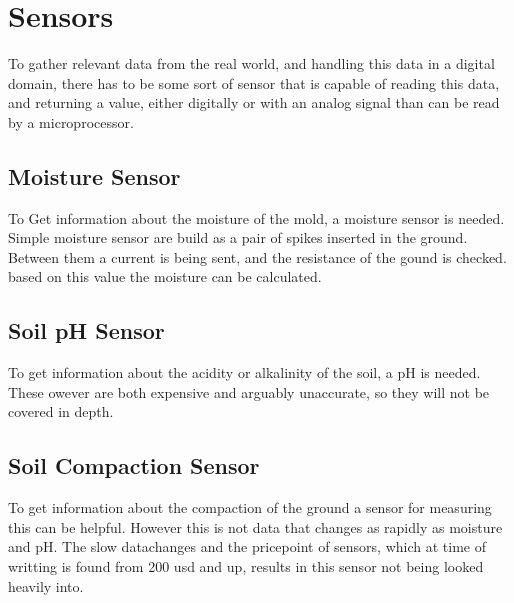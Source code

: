 \section{Sensors}
To gather relevant data from the real world, and handling this data in a digital domain, there has to be some sort of sensor that is capable of reading this data, and returning a value, either digitally or with an analog signal than can be read by a microprocessor.

\subsection{Moisture Sensor}
To Get information about the moisture of the mold, a moisture sensor is needed. Simple moisture sensor are build as a pair of spikes inserted in the ground. Between them a current is being sent, and the resistance of the gound is checked. based on this value the moisture can be calculated. %

\subsection{Soil pH Sensor}
To get information about the acidity or alkalinity of the soil, a pH is needed. These owever are both expensive and arguably unaccurate, so they will not be covered in depth. 

\subsection {Soil Compaction Sensor}
To get information about the compaction of the ground a sensor for measuring this can be helpful. However this is not data that changes as rapidly as moisture and pH. The slow datachanges and the pricepoint of sensors, which at time of writting is found from 200 usd and up, results in this sensor not being looked heavily into.
